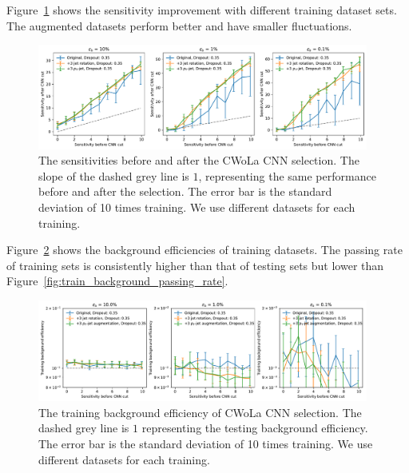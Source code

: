 \documentclass[12pt]{article}
\begin{document}
        Figure~\ref{fig:sensitivity_improvement_background_subtraction_dropout_35} shows the sensitivity improvement with different training dataset sets. The augmented datasets perform better and have smaller fluctuations. 
        \begin{figure}[htpb]
            \centering
            \includegraphics[width=0.97\textwidth]{HVmodel_sensitivity_improvement_origin_jet_aug_3_pt_jet_aug_3_bkg_subtraction_dp_35.pdf}
            \caption{The sensitivities before and after the CWoLa CNN selection. The slope of the dashed grey line is $1$, representing the same performance before and after the selection. The error bar is the standard deviation of 10 times training. We use different datasets for each training.}
            \label{fig:sensitivity_improvement_background_subtraction_dropout_35}
        \end{figure}

        Figure~\ref{fig:train_background_passing_rate_dropout_35} shows the background efficiencies of training datasets. The passing rate of training sets is consistently higher than that of testing sets but lower than Figure~\ref{fig:train_background_passing_rate}. 
        \begin{figure}[htpb]
            \centering
            \includegraphics[width=0.97\textwidth]{HVmodel_train_B_passing_rate_origin_jet_aug_3_pt_jet_aug_3_dp_35.pdf}
            \caption{The training background efficiency of CWoLa CNN selection. The dashed grey line is $1$ representing the testing background efficiency. The error bar is the standard deviation of 10 times training. We use different datasets for each training.}
            \label{fig:train_background_passing_rate_dropout_35}
        \end{figure}
\end{document}
